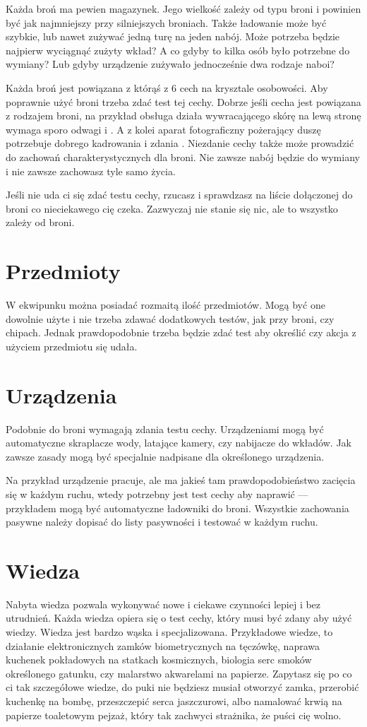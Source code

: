 Każda broń ma pewien magazynek.
Jego wielkość zależy od typu broni i powinien być jak najmniejszy przy silniejszych broniach.
Także ładowanie może być szybkie, lub nawet zużywać jedną turę na jeden nabój.
Może potrzeba będzie najpierw wyciągnąć zużyty wkład?
A co gdyby to kilka osób było potrzebne do wymiany?
Lub gdyby urządzenie zużywało jednocześnie dwa rodzaje naboi?

Każda broń jest powiązana z którąś z 6 cech na krysztale osobowości.
Aby poprawnie użyć broni trzeba zdać test tej cechy.
Dobrze jeśli cecha jest powiązana z rodzajem broni, na przykład obsługa działa wywracającego skórę na lewą stronę wymaga sporo odwagi i \abh.
A z kolei aparat fotograficzny pożerający duszę potrzebuje dobrego kadrowania i zdania \abp.
Niezdanie cechy także może prowadzić do zachowań charakterystycznych dla broni.
Nie zawsze nabój będzie do wymiany i nie zawsze zachowasz tyle samo życia.

Jeśli nie uda ci się zdać testu cechy, rzucasz \dxx i sprawdzasz na liście dołączonej do broni co nieciekawego cię czeka.
Zazwyczaj nie stanie się nic, ale to wszystko zależy od broni.

\section{Przedmioty}
W ekwipunku można posiadać rozmaitą ilość przedmiotów.
Mogą być one dowolnie użyte i nie trzeba zdawać dodatkowych testów, jak przy broni, czy chipach.
Jednak prawdopodobnie trzeba będzie zdać test aby określić czy akcja z użyciem przedmiotu się udała.

\section{Urządzenia}
Podobnie do broni wymagają zdania testu cechy.
Urządzeniami mogą być automatyczne skraplacze wody, latające kamery, czy nabijacze do wkładów.
Jak zawsze zasady mogą być specjalnie nadpisane dla określonego urządzenia.

Na przykład urządzenie pracuje, ale ma jakieś tam prawdopodobieństwo zacięcia się w każdym ruchu, wtedy potrzebny jest test cechy aby naprawić --- przykładem mogą być automatyczne ładowniki do broni.
Wszystkie zachowania pasywne należy dopisać do listy pasywności i testować w każdym ruchu.

\section{Wiedza}
Nabyta wiedza pozwala wykonywać nowe i ciekawe czynności lepiej i bez utrudnień.
Każda wiedza opiera się o test cechy, który musi być zdany aby użyć wiedzy.
Wiedza jest bardzo wąska i specjalizowana.
Przykładowe wiedze, to działanie elektronicznych zamków biometrycznych na tęczówkę, naprawa kuchenek pokładowych na statkach kosmicznych, biologia serc smoków określonego gatunku, czy malarstwo akwarelami na papierze.
Zapytasz się po co ci tak szczegółowe wiedze, do puki nie będziesz musiał otworzyć zamka, przerobić kuchenkę na bombę, przeszczepić serca jaszczurowi, albo namalować krwią na papierze toaletowym pejzaż, który tak zachwyci strażnika, że puści cię wolno.

